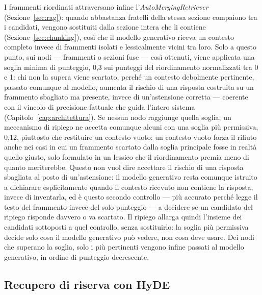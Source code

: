 I frammenti riordinati attraversano infine l'\emph{AutoMergingRetriever} (Sezione~\ref{sec:rag}): quando abbastanza
fratelli della stessa sezione compaiono tra i candidati, vengono sostituiti dalla sezione intera che li contiene
(Sezione~\ref{sec:chunking}), così che il modello generativo riceva un contesto completo invece di frammenti
isolati e lessicalmente vicini tra loro. Solo a questo punto, sui nodi --- frammenti o sezioni fuse --- così
ottenuti, viene applicata una soglia minima di punteggio, 0,3 sui punteggi del riordinamento normalizzati tra 0 e
1: chi non la supera viene scartato, perché un contesto
debolmente pertinente, passato comunque al modello, aumenta il rischio di una risposta costruita su un frammento
sbagliato ma presente, invece di un'astensione corretta --- coerente con il vincolo
di precisione fattuale che guida l'intero sistema (Capitolo~\ref{cap:architettura}). Se nessun nodo raggiunge quella
soglia, un meccanismo di ripiego ne accetta comunque alcuni con una soglia più permissiva, 0,12, piuttosto che
restituire un contesto vuoto: un contesto vuoto forza il rifiuto anche nei casi in cui un frammento scartato dalla
soglia principale fosse in realtà quello giusto, solo formulato in un lessico che il riordinamento premia meno di
quanto meriterebbe. Questo non vuol dire accettare il rischio di una risposta sbagliata al posto di un'astensione:
il modello generativo resta comunque istruito a dichiarare esplicitamente quando il contesto ricevuto non contiene
la risposta, invece di inventarla, ed è questo secondo controllo --- più accurato
perché legge il testo del frammento invece del solo punteggio --- a decidere se un candidato del ripiego risponde
davvero o va scartato. Il ripiego allarga quindi l'insieme dei candidati sottoposti a quel controllo, senza
sostituirlo: la soglia più permissiva decide solo cosa il modello generativo può vedere, non cosa deve usare. Dei
nodi che superano la soglia, solo i più pertinenti vengono infine passati al modello generativo, in ordine di
punteggio decrescente.

\subsection{Recupero di riserva con HyDE}\label{sec:hyde-retrieval}

